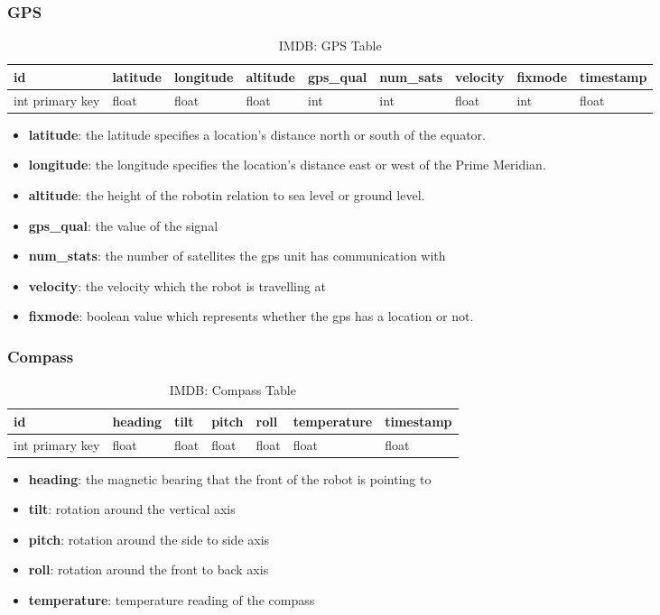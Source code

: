 \subsubsection{GPS}
\begin{table}[!htb]
\centering
\begin{tabular}{|l|l|l|l|l|l|l|l|l|}
\hline
id              & latitude & longitude & altitude & gps\_qual & num\_sats & velocity & fixmode & timestamp \\ \hline
int primary key & float    & float     & float    & int       & int       & float    & int     & float\\ \hline
\end{tabular}
\caption{IMDB: GPS Table}
\label{tab:db-gps}
\end{table}
\begin{itemize}
\item{\textbf{latitude}}: the latitude specifies a location's distance north or south of the equator.
\item{\textbf{longitude}}: the longitude specifies the location's distance east or west of the Prime Meridian.
\item{\textbf{altitude}}: the height of the robotin relation to sea level or ground level.
\item{\textbf{gps\_qual}}: the value of the signal
\item{\textbf{num\_stats}}: the number of satellites the gps unit has communication with
\item{\textbf{velocity}}: the velocity which the robot is travelling at
\item{\textbf{fixmode}}: boolean value which represents whether the gps has a location or not.  
\end{itemize}


\subsubsection{Compass}
\begin{table}[!htb]
\centering
\begin{tabular}{|l|l|l|l|l|l|l|}
\hline
id              & heading & tilt  & pitch & roll  & temperature & timestamp \\ \hline
int primary key & float   & float & float & float & float       & float \\ \hline
\end{tabular}
\caption{IMDB: Compass Table}
\label{tab:db-compass}
\end{table}
\begin{itemize}
\item{\textbf{heading}}: the magnetic bearing that the front of the robot is pointing to
\item{\textbf{tilt}}: rotation around the vertical axis
\item{\textbf{pitch}}: rotation around the side to side axis
\item{\textbf{roll}}: rotation around the front to back axis
\item{\textbf{temperature}}: temperature reading of the compass
\end{itemize}


